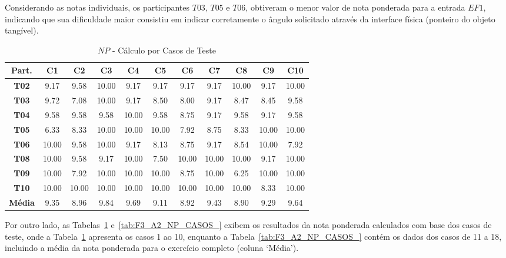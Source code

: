 Considerando as notas individuais, os participantes $T03$, $T05$ e $T06$, obtiveram o menor valor de nota ponderada para a entrada $EF1$, indicando que sua dificuldade maior consistiu em indicar corretamente o ângulo solicitado através da interface física (ponteiro do objeto tangível).

\begin{table}[htbp]
	\centering
	\caption{$NP$ - Cálculo por Casos de Teste}
	\begin{tabular}{|c|c|c|c|c|c|c|c|c|c|c|}
		\hline
		\rowcolor[HTML]{D9D9D9} 
		\cellcolor[HTML]{D0CECE}\textbf{Part.} & \textbf{C1} & \textbf{C2} & \textbf{C3} & \textbf{C4} & \textbf{C5} & \textbf{C6} & \textbf{C7} & \textbf{C8} & \textbf{C9} & \textbf{C10} \\ \hline
		\textbf{T02} & 9.17 & 9.58 & 10.00 & 9.17 & 9.17 & 9.17 & 9.17 & 10.00 & 9.17 & 10.00 \\ \hline
		\rowcolor[HTML]{F2F2F2} 
		\textbf{T03} & 9.72 & 7.08 & 10.00 & 9.17 & 8.50 & 8.00 & 9.17 & 8.47 & 8.45 & 9.58 \\ \hline
		\textbf{T04} & 9.58 & 9.58 & 9.58 & 10.00 & 9.58 & 8.75 & 9.17 & 9.58 & 9.17 & 9.58 \\ \hline
		\rowcolor[HTML]{F2F2F2} 
		\textbf{T05} & 6.33 & 8.33 & 10.00 & 10.00 & 10.00 & 7.92 & 8.75 & 8.33 & 10.00 & 10.00 \\ \hline
		\textbf{T06} & 10.00 & 9.58 & 10.00 & 9.17 & 8.13 & 8.75 & 9.17 & 8.54 & 10.00 & 7.92 \\ \hline
		\rowcolor[HTML]{F2F2F2} 
		\textbf{T08} & 10.00 & 9.58 & 9.17 & 10.00 & 7.50 & 10.00 & 10.00 & 10.00 & 9.17 & 10.00 \\ \hline
		\textbf{T09} & 10.00 & 7.92 & 10.00 & 10.00 & 10.00 & 8.75 & 10.00 & 6.25 & 10.00 & 10.00 \\ \hline
		\rowcolor[HTML]{F2F2F2} 
		\textbf{T10} & 10.00 & 10.00 & 10.00 & 10.00 & 10.00 & 10.00 & 10.00 & 10.00 & 8.33 & 10.00 \\ \hline
		\rowcolor[HTML]{D0CECE} 
		\textbf{Média} & 9.35 & 8.96 & 9.84 & 9.69 & 9.11 & 8.92 & 9.43 & 8.90 & 9.29 & 9.64 \\ \hline
	\end{tabular}
	\label{tab:F3_A2_NP_CASOS}
\end{table}

Por outro lado, as Tabelas~\ref{tab:F3_A2_NP_CASOS} e~\ref{tab:F3_A2_NP_CASOS_} exibem os resultados da nota ponderada calculados com base dos casos de teste, onde a Tabela~\ref{tab:F3_A2_NP_CASOS} apresenta os casos 1 ao 10, enquanto a Tabela~\ref{tab:F3_A2_NP_CASOS_} contém os dados dos casos de 11 a 18, incluindo a média da nota ponderada para o exercício completo (coluna `Média').

